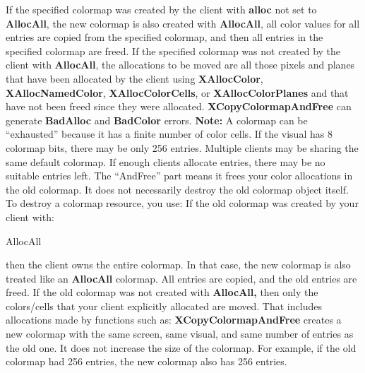 \documentclass{report}
\begin{document}
\begin{itemize}
            \bigbreak \noindent
            If the specified colormap was created by the client with \textbf{alloc} not set to \textbf{AllocAll}, the new colormap is also created with \textbf{AllocAll}, all color values for all entries are copied from the specified colormap, and then all entries in the specified colormap are freed.
            \bigbreak \noindent
            If the specified colormap was not created by the client with \textbf{AllocAll}, the allocations to be moved are all those pixels and planes that have been allocated by the client using \textbf{XAllocColor}, \textbf{XAllocNamedColor}, \textbf{XAllocColorCells}, or \textbf{XAllocColorPlanes} and that have not been freed since they were allocated.
            \bigbreak \noindent
            \textbf{XCopyColormapAndFree} can generate \textbf{BadAlloc} and \textbf{BadColor} errors.
            \bigbreak \noindent 
            \textbf{Note:} A colormap can be “exhausted” because it has a finite number of color cells.
            \bigbreak \noindent 
            If the visual has 8 colormap bits, there may be only 256 entries. Multiple clients may be sharing the same default colormap. If enough clients allocate entries, there may be no suitable entries left.
            \bigbreak \noindent 
            The “AndFree” part means it frees your color allocations in the old colormap. It does not necessarily destroy the old colormap object itself. To destroy a colormap resource, you use:
            \bigbreak \noindent 
            If the old colormap was created by your client with:
            \bigbreak \noindent 
            \begin{cppcode}
            AllocAll
            \end{cppcode}
            \bigbreak \noindent 
            then the client owns the entire colormap. In that case, the new colormap is also treated like an \textbf{AllocAll} colormap. All entries are copied, and the old entries are freed.
            \bigbreak \noindent 
            If the old colormap was not created with \textbf{AllocAll,} then only the colors/cells that your client explicitly allocated are moved. That includes allocations made by functions such as:
            \bigbreak \noindent 
            \textbf{XCopyColormapAndFree} creates a new colormap with the same screen, same visual, and same number of entries as the old one. It does not increase the size of the colormap.
            \bigbreak \noindent 
            For example, if the old colormap had 256 entries, the new colormap also has 256 entries.
            \bigbreak \noindent 

\end{itemize}
\end{document}
